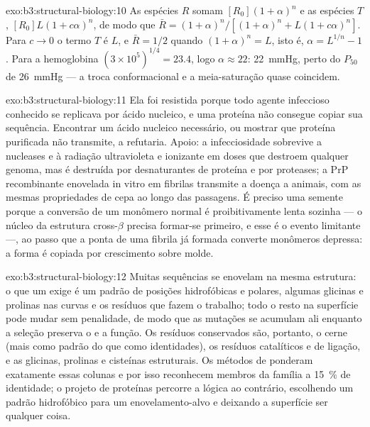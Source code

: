 \begin{solution}{exo:b3:structural-biology:10}
As espécies $R$ somam $[R_{0}](1+\alpha)^{n}$ e as espécies $T$,
$[R_{0}]L(1+c\alpha)^{n}$, de modo que
$\bar R = (1+\alpha)^{n}/[(1+\alpha)^{n}
+ L(1+c\alpha)^{n}]$. Para
$c \to 0$ o termo $T$ é $L$, e $\bar R =
1/2$ quando
$(1+\alpha)^{n} = L$, isto é, $\alpha = L^{1/n} - 1$. Para a
hemoglobina $(3\times 10^{5})^{1/4} = 23.4$, logo $\alpha \approx 22$:
\qty{22}{mmHg}, perto do $P_{50}$ de \qty{26}{mmHg} --- a troca
conformacional e a meia-saturação quase coincidem.
\end{solution}

\begin{solution}{exo:b3:structural-biology:11}
Ela foi resistida porque todo agente infeccioso conhecido se replicava
por ácido nucleico, e uma proteína não consegue copiar sua sequência.
Encontrar um ácido nucleico necessário, ou mostrar que proteína
purificada não transmite, a refutaria. Apoio: a infecciosidade
sobrevive a nucleases e à radiação ultravioleta e ionizante em doses
que destroem qualquer genoma, mas é destruída por desnaturantes de
proteína e por proteases; a PrP recombinante enovelada in vitro em
fibrilas transmite a doença a animais, com as mesmas propriedades de
cepa ao longo das passagens. É preciso uma semente porque a conversão
de um monômero normal é proibitivamente lenta sozinha --- o núcleo da
estrutura cross-$\beta$ precisa formar-se primeiro, e esse é o evento
limitante ---, ao passo que a ponta de uma fibrila já formada converte
monômeros depressa: a forma é copiada por crescimento sobre molde.
\end{solution}

\begin{solution}{exo:b3:structural-biology:12}
Muitas sequências se enovelam na mesma estrutura: o que um 
exige é um padrão de posições hidrofóbicas e polares, algumas glicinas
e prolinas nas curvas e os resíduos que fazem o trabalho; todo o resto
na superfície pode mudar sem penalidade, de modo que as mutações se
acumulam ali enquanto a seleção preserva o  e a função. Os
resíduos conservados são, portanto, o cerne (mais como padrão do que
como identidades), os resíduos catalíticos e de ligação, e as glicinas,
prolinas e cisteínas estruturais. Os métodos de  ponderam
exatamente essas colunas e por isso reconhecem membros da família a
\qty{15}{\%} de identidade; o projeto de proteínas percorre a lógica ao
contrário, escolhendo um padrão hidrofóbico para um enovelamento-alvo e
deixando a superfície ser qualquer coisa.
\end{solution}

